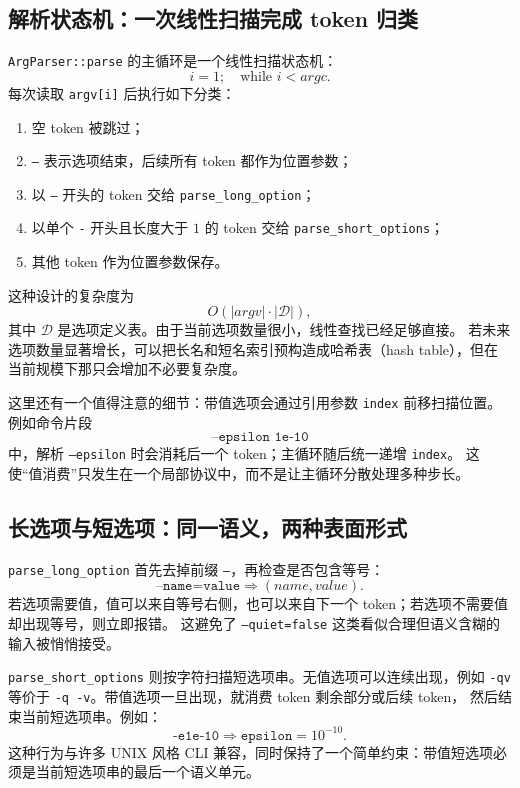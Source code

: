 \subsection{解析状态机：一次线性扫描完成 token 归类}

\texttt{ArgParser::parse} 的主循环是一个线性扫描状态机：
\[
    i=1;\quad
    \text{while } i<argc.
\]
每次读取 \texttt{argv[i]} 后执行如下分类：

\begin{enumerate}
    \item 空 token 被跳过；
    \item \texttt{--} 表示选项结束，后续所有 token 都作为位置参数；
    \item 以 \texttt{--} 开头的 token 交给 \texttt{parse\_long\_option}；
    \item 以单个 \texttt{-} 开头且长度大于 $1$ 的 token 交给 \texttt{parse\_short\_options}；
    \item 其他 token 作为位置参数保存。
\end{enumerate}

这种设计的复杂度为
\[
    O(|argv|\cdot |\mathcal{D}|),
\]
其中 $\mathcal{D}$ 是选项定义表。由于当前选项数量很小，线性查找已经足够直接。
若未来选项数量显著增长，可以把长名和短名索引预构造成哈希表（hash table），但在当前规模下那只会增加不必要复杂度。

这里还有一个值得注意的细节：带值选项会通过引用参数 \texttt{index} 前移扫描位置。
例如命令片段
\[
    \texttt{--epsilon 1e-10}
\]
中，解析 \texttt{--epsilon} 时会消耗后一个 token；主循环随后统一递增 \texttt{index}。
这使“值消费”只发生在一个局部协议中，而不是让主循环分散处理多种步长。

\subsection{长选项与短选项：同一语义，两种表面形式}

\texttt{parse\_long\_option} 首先去掉前缀 \texttt{--}，再检查是否包含等号：
\[
    \texttt{--name=value}
    \Rightarrow
    (name,value).
\]
若选项需要值，值可以来自等号右侧，也可以来自下一个 token；若选项不需要值却出现等号，则立即报错。
这避免了 \texttt{--quiet=false} 这类看似合理但语义含糊的输入被悄悄接受。

\texttt{parse\_short\_options} 则按字符扫描短选项串。无值选项可以连续出现，例如
\texttt{-qv} 等价于 \texttt{-q -v}。带值选项一旦出现，就消费 token 剩余部分或后续 token，
然后结束当前短选项串。例如：
\[
    \texttt{-e1e-10}
    \Rightarrow
    \texttt{epsilon}=10^{-10}.
\]
这种行为与许多 UNIX 风格 CLI 兼容，同时保持了一个简单约束：带值短选项必须是当前短选项串的最后一个语义单元。

